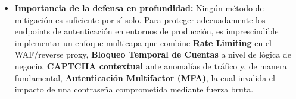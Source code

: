 \documentclass[letter,12pt]{article}
\begin{document}
\begin{itemize}
    \item \textbf{Importancia de la defensa en profundidad:} 
    Ningún método de mitigación es suficiente por sí solo. Para proteger adecuadamente los endpoints de autenticación en entornos de producción, es imprescindible implementar un enfoque multicapa que combine \textbf{Rate Limiting} en el WAF/reverse proxy, \textbf{Bloqueo Temporal de Cuentas} a nivel de lógica de negocio, \textbf{CAPTCHA contextual} ante anomalías de tráfico y, de manera fundamental, \textbf{Autenticación Multifactor (MFA)}, la cual invalida el impacto de una contraseña comprometida mediante fuerza bruta.
\end{itemize}
\end{document}
